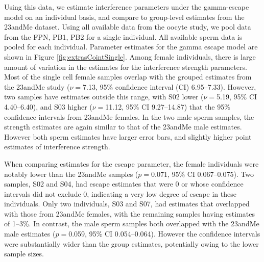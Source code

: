 Using this data, we estimate interference parameters under the gamma-escape model on an individual basis, and compare to group-level estimates from the 23andMe dataset\cite{Campbell2015}.
Using all available data from the oocyte study, we pool data from the FPN, PB1, PB2 for a single individual.
All available sperm data is pooled for each individual.
Parameter estimates for the gamma escape model are shown in Figure \ref{fig:extrasCointSingle}.
Among female individuals, there is large amount of variation in the estimates for the interference strength parameters.
Most of the single cell female samples overlap with the grouped estimates from the 23andMe study ($\nu=$7.13, 95\% confidence interval (CI) 6.95--7.33).
However, two samples have estimates outside this range, with S02 lower ($\nu=$5.19, 95\% CI 4.40--6.40), and S03 higher ($\nu=$11.12, 95\% CI 9.27--14.87) that the 95\% confidence intervals from 23andMe females.
In the two male sperm samples, the strength estimates are again similar to that of the 23andMe male estimates.
However both sperm estimates have larger error bars, and slightly higher point estimates of interference strength.

When comparing estimates for the escape parameter, the female individuals were notably lower than the 23andMe samples ($p=$0.071, 95\% CI 0.067--0.075).
Two samples, S02 and S04, had escape estimates that were 0 or whose confidence intervals did not exclude 0, indicating a very low degree of escape in these individuals.
Only two individuals, S03 and S07, had estimates that overlapped with those from 23andMe females, with the remaining samples having estimates of 1--3\%.
In contrast, the male sperm samples both overlapped with the 23andMe male estimates ($p=$0.059, 95\% CI 0.054--0.064).
However the confidence intervals were substantially wider than the group estimates, potentially owing to the lower sample sizes.


